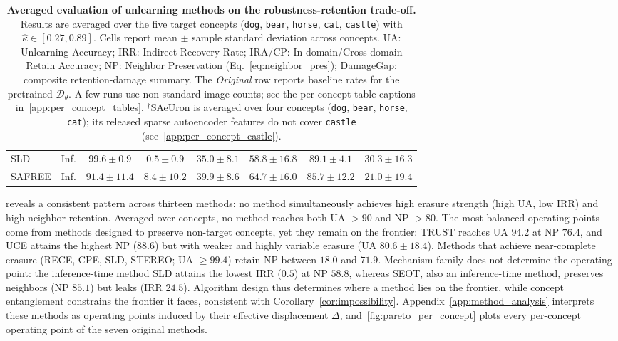 \begin{table}[t]
\begin{tabular}{llcccccc}
SLD    & Inf. & $99.6 \pm 0.9$  & $0.5 \pm 0.9$   & $35.0 \pm 8.1$  & $58.8 \pm 16.8$  & $89.1 \pm 4.1$  & $30.3 \pm 16.3$ \\
SAFREE & Inf. & $91.4 \pm 11.4$ & $8.4 \pm 10.2$  & $39.9 \pm 8.6$  & $64.7 \pm 16.0$  & $85.7 \pm 12.2$ & $21.0 \pm 19.4$ \\
\bottomrule
\end{tabular}
\caption{\textbf{Averaged evaluation of unlearning methods on the robustness-retention trade-off.} Results are averaged over the five target concepts (\texttt{dog}, \texttt{bear}, \texttt{horse}, \texttt{cat}, \texttt{castle}) with $\hat\kappa \in [{0.27}, {0.89}]$. Cells report mean $\pm$ sample standard deviation across concepts. UA: Unlearning Accuracy; IRR: Indirect Recovery Rate; IRA/CP: In-domain/Cross-domain Retain Accuracy; NP: Neighbor Preservation (Eq.~\eqref{eq:neighbor_pres}); DamageGap: composite retention-damage summary. The \emph{Original} row reports baseline rates for the pretrained $\mathcal{D}_\theta$. A few runs use non-standard image counts; see the per-concept table captions in~\cref{app:per_concept_tables}. $^\dagger$SAeUron is averaged over four concepts (\texttt{dog}, \texttt{bear}, \texttt{horse}, \texttt{cat}); its released sparse autoencoder features do not cover \texttt{castle} (see~\cref{app:per_concept_castle}).}
\label{tab:main_results_avg}
\end{table}


 reveals a consistent pattern across thirteen methods: no method simultaneously achieves high erasure strength (high UA, low IRR) and high neighbor retention. Averaged over concepts, no method reaches both UA $>90$ and NP $>80$. The most balanced operating points come from methods designed to preserve non-target concepts, yet they remain on the frontier: TRUST reaches UA $94.2$ at NP $76.4$, and UCE attains the highest NP ($88.6$) but with weaker and highly variable erasure (UA $80.6\pm18.4$). Methods that achieve near-complete erasure (RECE, CPE, SLD, STEREO; UA $\geq 99.4$) retain NP between $18.0$ and $71.9$. Mechanism family does not determine the operating point: the inference-time method SLD attains the lowest IRR ($0.5$) at NP $58.8$, whereas SEOT, also an inference-time method, preserves neighbors (NP $85.1$) but leaks (IRR $24.5$). Algorithm design thus determines where a method lies on the frontier, while concept entanglement constrains the frontier it faces, consistent with Corollary~\ref{cor:impossibility}. Appendix~\ref{app:method_analysis} interprets these methods as operating points induced by their effective displacement $\Delta$, and~\cref{fig:pareto_per_concept} plots every per-concept operating point of the seven original methods.

